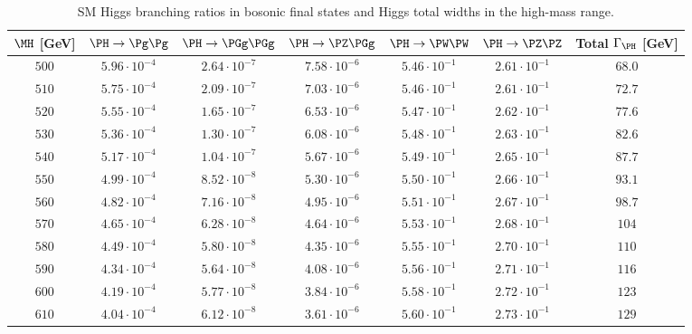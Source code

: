 \begin{table}
  \vspace{-\headsep}
  \caption{SM Higgs branching ratios in bosonic final states and Higgs total widths in the high-mass range.}
  \label{tab:BR-hm.part2}
  \centering
  \small
  \begin{tabular}{ccccccc}\hline
$\MH$ [GeV] & $\PH \rightarrow \Pg\Pg$ & $\PH \rightarrow \PGg \PGg$ & $\PH \rightarrow
\PZ\PGg$ & $\PH \rightarrow \PW\PW$
& $\PH \rightarrow \PZ\PZ$ & Total $\Gamma_{\PH}$ [GeV]\\
\hline
$500 $&$ 5.96\cdot 10^{-4}  $&$ 2.64\cdot 10^{-7}  $&$ 7.58\cdot 10^{-6}  $&$ 5.46\cdot 10^{-1}  $&$ 2.61\cdot 10^{-1}  $&$ 68.0  $\\
$510 $&$ 5.75\cdot 10^{-4}  $&$ 2.09\cdot 10^{-7}  $&$ 7.03\cdot 10^{-6}  $&$ 5.46\cdot 10^{-1}  $&$ 2.61\cdot 10^{-1}  $&$ 72.7  $\\
$520 $&$ 5.55\cdot 10^{-4}  $&$ 1.65\cdot 10^{-7}  $&$ 6.53\cdot 10^{-6}  $&$ 5.47\cdot 10^{-1}  $&$ 2.62\cdot 10^{-1}  $&$ 77.6  $\\
$530 $&$ 5.36\cdot 10^{-4}  $&$ 1.30\cdot 10^{-7}  $&$ 6.08\cdot 10^{-6}  $&$ 5.48\cdot 10^{-1}  $&$ 2.63\cdot 10^{-1}  $&$ 82.6  $\\
$540 $&$ 5.17\cdot 10^{-4}  $&$ 1.04\cdot 10^{-7}  $&$ 5.67\cdot 10^{-6}  $&$ 5.49\cdot 10^{-1}  $&$ 2.65\cdot 10^{-1}  $&$ 87.7  $\\
$550 $&$ 4.99\cdot 10^{-4}  $&$ 8.52\cdot 10^{-8}  $&$ 5.30\cdot 10^{-6}  $&$ 5.50\cdot 10^{-1}  $&$ 2.66\cdot 10^{-1}  $&$ 93.1  $\\
$560 $&$ 4.82\cdot 10^{-4}  $&$ 7.16\cdot 10^{-8}  $&$ 4.95\cdot 10^{-6}  $&$ 5.51\cdot 10^{-1}  $&$ 2.67\cdot 10^{-1}  $&$ 98.7 $\\
$570 $&$ 4.65\cdot 10^{-4}  $&$ 6.28\cdot 10^{-8}  $&$ 4.64\cdot 10^{-6}  $&$ 5.53\cdot 10^{-1}  $&$ 2.68\cdot 10^{-1}  $&$ 104 $\\
$580 $&$ 4.49\cdot 10^{-4}  $&$ 5.80\cdot 10^{-8}  $&$ 4.35\cdot 10^{-6}  $&$ 5.55\cdot 10^{-1}  $&$ 2.70\cdot 10^{-1}  $&$ 110 $\\
$590 $&$ 4.34\cdot 10^{-4}  $&$ 5.64\cdot 10^{-8}  $&$ 4.08\cdot 10^{-6}  $&$ 5.56\cdot 10^{-1}  $&$ 2.71\cdot 10^{-1}  $&$ 116 $\\
$600 $&$ 4.19\cdot 10^{-4}  $&$ 5.77\cdot 10^{-8}  $&$ 3.84\cdot 10^{-6}  $&$ 5.58\cdot 10^{-1}  $&$ 2.72\cdot 10^{-1}  $&$ 123 $\\
$610 $&$ 4.04\cdot 10^{-4}  $&$ 6.12\cdot 10^{-8}  $&$ 3.61\cdot 10^{-6}  $&$ 5.60\cdot 10^{-1}  $&$ 2.73\cdot 10^{-1}  $&$ 129 $\\

\end{tabular}
\end{table}
